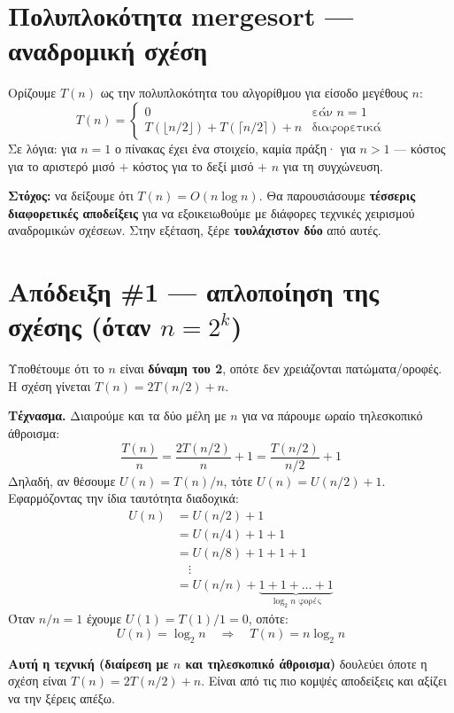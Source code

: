 \documentclass[11pt,a4paper]{article}
\begin{document}
\section{Πολυπλοκότητα mergesort --- αναδρομική σχέση}

Ορίζουμε $T(n)$ ως την πολυπλοκότητα του αλγορίθμου για είσοδο μεγέθους $n$:
\[
T(n) = \begin{cases}
0 & \text{εάν } n = 1 \\
T(\lfloor n/2 \rfloor) + T(\lceil n/2 \rceil) + n & \text{διαφορετικά}
\end{cases}
\]
Σε λόγια: για $n = 1$ ο πίνακας έχει ένα στοιχείο, καμία πράξη· για $n > 1$ ---
κόστος για το αριστερό μισό $+$ κόστος για το δεξί μισό $+$ $n$ για τη
συγχώνευση.

\textbf{Στόχος:} να δείξουμε ότι $T(n) = O(n \log n)$. Θα παρουσιάσουμε
\textbf{τέσσερις διαφορετικές αποδείξεις} για να εξοικειωθούμε με διάφορες
τεχνικές χειρισμού αναδρομικών σχέσεων. Στην εξέταση, ξέρε \textbf{τουλάχιστον
δύο} από αυτές.

\section{Απόδειξη \#1 --- απλοποίηση της σχέσης (όταν $n = 2^k$)}

Υποθέτουμε ότι το $n$ είναι \textbf{δύναμη του 2}, οπότε δεν χρειάζονται
πατώματα/οροφές. Η σχέση γίνεται $T(n) = 2 T(n/2) + n$.

\textbf{Τέχνασμα.} Διαιρούμε και τα δύο μέλη με $n$ για να πάρουμε ωραίο
τηλεσκοπικό άθροισμα:
\[
\frac{T(n)}{n} = \frac{2 T(n/2)}{n} + 1 = \frac{T(n/2)}{n/2} + 1
\]
Δηλαδή, αν θέσουμε $U(n) = T(n)/n$, τότε $U(n) = U(n/2) + 1$. Εφαρμόζοντας την
ίδια ταυτότητα διαδοχικά:
\[
\begin{aligned}
U(n) &= U(n/2) + 1 \\
     &= U(n/4) + 1 + 1 \\
     &= U(n/8) + 1 + 1 + 1 \\
     &\quad \vdots \\
     &= U(n/n) + \underbrace{1 + 1 + \dots + 1}_{\log_2 n \text{ φορές}}
\end{aligned}
\]
Όταν $n/n = 1$ έχουμε $U(1) = T(1)/1 = 0$, οπότε:
\[
U(n) = \log_2 n \quad \Rightarrow \quad T(n) = n \log_2 n
\]

\begin{keypoint}
\textbf{Αυτή η τεχνική (διαίρεση με $n$ και τηλεσκοπικό άθροισμα)} δουλεύει όποτε
η σχέση είναι $T(n) = 2 T(n/2) + n$. Είναι από τις πιο κομψές αποδείξεις και
αξίζει να την ξέρεις απέξω.
\end{keypoint}
\end{document}
